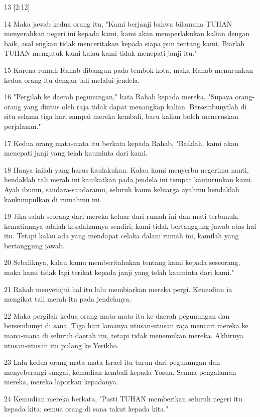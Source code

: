 \par 13 [2:12]
\par 14 Maka jawab kedua orang itu, "Kami berjanji bahwa bilamana TUHAN menyerahkan negeri ini kepada kami, kami akan memperlakukan kalian dengan baik, asal engkau tidak menceritakan kepada siapa pun tentang kami. Biarlah TUHAN mengutuk kami kalau kami tidak menepati janji itu."
\par 15 Karena rumah Rahab dibangun pada tembok kota, maka Rahab menurunkan kedua orang itu dengan tali melalui jendela.
\par 16 "Pergilah ke daerah pegunungan," kata Rahab kepada mereka, "Supaya orang-orang yang diutus oleh raja tidak dapat menangkap kalian. Bersembunyilah di situ selama tiga hari sampai mereka kembali, baru kalian boleh meneruskan perjalanan."
\par 17 Kedua orang mata-mata itu berkata kepada Rahab, "Baiklah, kami akan menepati janji yang telah kauminta dari kami.
\par 18 Hanya inilah yang harus kaulakukan. Kalau kami menyerbu negerimu nanti, hendaklah tali merah ini kauikatkan pada jendela ini tempat kauturunkan kami. Ayah ibumu, saudara-saudaramu, seluruh kaum keluarga ayahmu hendaklah kaukumpulkan di rumahmu ini.
\par 19 Jika salah seorang dari mereka keluar dari rumah ini dan mati terbunuh, kematiannya adalah kesalahannya sendiri; kami tidak bertanggung jawab atas hal itu. Tetapi kalau ada yang mendapat celaka dalam rumah ini, kamilah yang bertanggung jawab.
\par 20 Sebaliknya, kalau kamu memberitahukan tentang kami kepada seseorang, maka kami tidak lagi terikat kepada janji yang telah kauminta dari kami."
\par 21 Rahab menyetujui hal itu lalu membiarkan mereka pergi. Kemudian ia mengikat tali merah itu pada jendelanya.
\par 22 Maka pergilah kedua orang mata-mata itu ke daerah pegunungan dan bersembunyi di sana. Tiga hari lamanya utusan-utusan raja mencari mereka ke mana-mana di seluruh daerah itu, tetapi tidak menemukan mereka. Akhirnya utusan-utusan itu pulang ke Yerikho.
\par 23 Lalu kedua orang mata-mata Israel itu turun dari pegunungan dan menyeberangi sungai, kemudian kembali kepada Yosua. Semua pengalaman mereka, mereka laporkan kepadanya.
\par 24 Kemudian mereka berkata, "Pasti TUHAN memberikan seluruh negeri itu kepada kita; semua orang di sana takut kepada kita."

